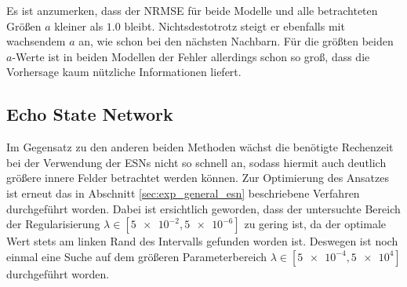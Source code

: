 Es ist anzumerken, dass der NRMSE für beide Modelle und alle betrachteten Größen $a$ kleiner als $1.0$ bleibt. Nichtsdestotrotz steigt er ebenfalls mit wachsendem $a$ an, wie schon bei den nächsten Nachbarn. Für die größten beiden $a$-Werte ist in beiden Modellen der Fehler allerdings schon so groß, dass die Vorhersage kaum nützliche Informationen liefert.

\subsection{Echo State Network}
Im Gegensatz zu den anderen beiden Methoden wächst die benötigte Rechenzeit bei der Verwendung der \textsc{ESN}s nicht so schnell an, sodass hiermit auch deutlich größere innere Felder betrachtet werden können. Zur Optimierung des Ansatzes ist erneut das in Abschnitt \ref{sec:exp_general_esn} beschriebene Verfahren durchgeführt worden. Dabei ist ersichtlich geworden, dass der untersuchte Bereich der Regularisierung $\lambda \in [\num{5e-2},\num{5e-6}]$ zu gering ist, da der optimale Wert stets am linken Rand des Intervalls gefunden worden ist. Deswegen ist noch einmal eine Suche auf dem größeren Parameterbereich $\lambda \in [\num{5e-4},\num{5e+4}]$ durchgeführt worden.

